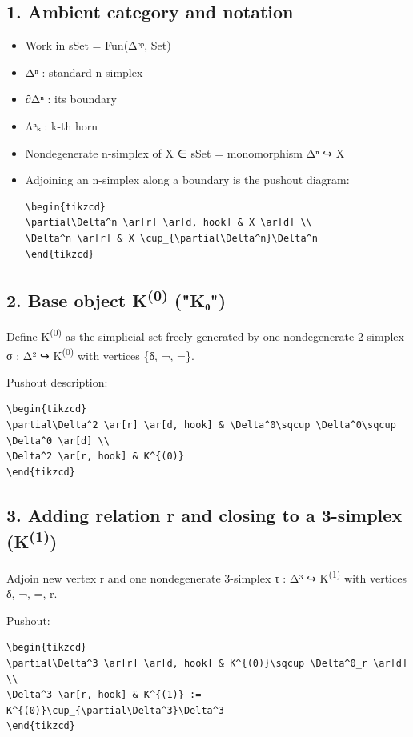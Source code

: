 \documentclass[11pt]{article}
\begin{document}
\subsection*{1. Ambient category and notation}
\label{sec:org83cc211}
\begin{itemize}
\item Work in sSet = Fun(Δᵒᵖ, Set)
\item Δⁿ : standard n-simplex
\item ∂Δⁿ : its boundary
\item Λⁿₖ : k-th horn
\item Nondegenerate n-simplex of X ∈ sSet = monomorphism Δⁿ ↪ X
\item Adjoining an n-simplex along a boundary is the pushout diagram:

\begin{verbatim}
\begin{tikzcd}
\partial\Delta^n \ar[r] \ar[d, hook] & X \ar[d] \\
\Delta^n \ar[r] & X \cup_{\partial\Delta^n}\Delta^n
\end{tikzcd}
\end{verbatim}
\end{itemize}
\subsection*{2. Base object K\textsuperscript{(0)} ("K₀")}
\label{sec:org8c19235}
Define K\textsuperscript{(0)} as the simplicial set freely generated by one nondegenerate 2-simplex
σ : Δ² ↪ K\textsuperscript{(0)}
with vertices \{δ, ¬, =\}.

Pushout description:
\begin{verbatim}
\begin{tikzcd}
\partial\Delta^2 \ar[r] \ar[d, hook] & \Delta^0\sqcup \Delta^0\sqcup \Delta^0 \ar[d] \\
\Delta^2 \ar[r, hook] & K^{(0)}
\end{tikzcd}
\end{verbatim}
\subsection*{3. Adding relation r and closing to a 3-simplex (K\textsuperscript{(1)})}
\label{sec:org89459d9}
Adjoin new vertex r and one nondegenerate 3-simplex τ : Δ³ ↪ K\textsuperscript{(1)}
with vertices δ, ¬, =, r.

Pushout:
\begin{verbatim}
\begin{tikzcd}
\partial\Delta^3 \ar[r] \ar[d, hook] & K^{(0)}\sqcup \Delta^0_r \ar[d] \\
\Delta^3 \ar[r, hook] & K^{(1)} := K^{(0)}\cup_{\partial\Delta^3}\Delta^3
\end{tikzcd}
\end{verbatim}
\end{document}
